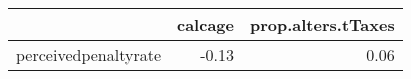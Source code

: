 \begin{table}[ht]
\centering
\begin{tabular}{rrr}
  \hline
 & calcage & prop.alters.tTaxes \\ 
  \hline
perceivedpenaltyrate & -0.13 & 0.06 \\ 
   \hline
\end{tabular}
\end{table}
